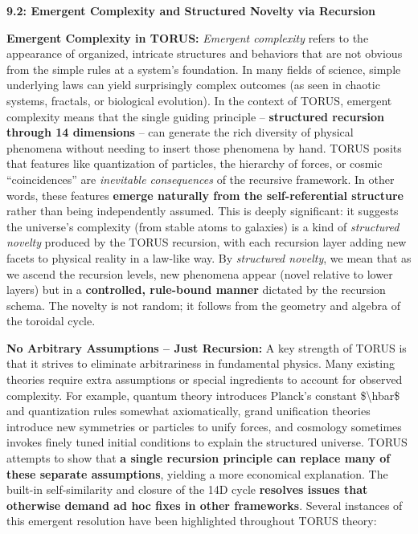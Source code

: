 \documentclass[]{article}
\begin{document}
\textbf{9.2: Emergent Complexity and Structured Novelty via Recursion}

\textbf{Emergent Complexity in TORUS:} \emph{Emergent complexity} refers
to the appearance of organized, intricate structures and behaviors that
are not obvious from the simple rules at a system's foundation. In many
fields of science, simple underlying laws can yield surprisingly complex
outcomes (as seen in chaotic systems, fractals, or biological
evolution). In the context of TORUS, emergent complexity means that the
single guiding principle -- \textbf{structured recursion through 14
dimensions} -- can generate the rich diversity of physical phenomena
without needing to insert those phenomena by hand. TORUS posits that
features like quantization of particles, the hierarchy of forces, or
cosmic ``coincidences'' are \emph{inevitable consequences} of the
recursive framework. In other words, these features \textbf{emerge
naturally from the self-referential structure} rather than being
independently assumed. This is deeply significant: it suggests the
universe's complexity (from stable atoms to galaxies) is a kind of
\emph{structured novelty} produced by the TORUS recursion, with each
recursion layer adding new facets to physical reality in a law-like way.
By \emph{structured novelty}, we mean that as we ascend the recursion
levels, new phenomena appear (novel relative to lower layers) but in a
\textbf{controlled, rule-bound manner} dictated by the recursion schema.
The novelty is not random; it follows from the geometry and algebra of
the toroidal cycle.

\textbf{No Arbitrary Assumptions -- Just Recursion:} A key strength of
TORUS is that it strives to eliminate arbitrariness in fundamental
physics. Many existing theories require extra assumptions or special
ingredients to account for observed complexity. For example, quantum
theory introduces Planck's constant \$\textbackslash{}hbar\$ and
quantization rules somewhat axiomatically, grand unification theories
introduce new symmetries or particles to unify forces, and cosmology
sometimes invokes finely tuned initial conditions to explain the
structured universe. TORUS attempts to show that \textbf{a single
recursion principle can replace many of these separate assumptions},
yielding a more economical explanation. The built-in self-similarity and
closure of the 14D cycle \textbf{resolves issues that otherwise demand
ad hoc fixes in other frameworks​}. Several instances of this emergent
resolution have been highlighted throughout TORUS theory:
\end{document}
